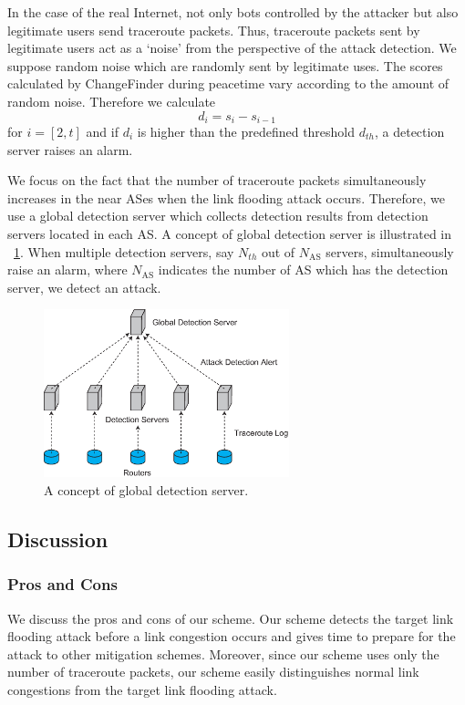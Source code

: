 \documentclass[conference]{IEEEtran}
\begin{document}
    In the case of the real Internet, not only bots controlled by the attacker but also legitimate users send traceroute packets.
    Thus, traceroute packets sent by legitimate users act as a `noise' from the perspective of the attack detection.
    We suppose random noise which are randomly sent by legitimate uses.
    The scores calculated by ChangeFinder during peacetime vary according to the amount of random noise.
    Therefore we calculate
    \begin{equation}
      d_i = s_i - s_{i-1}
      \label{Difference}
    \end{equation}
    for $i = [2, t]$ and if $d_i$ is higher than the predefined threshold $d_{th}$, a detection server raises an alarm.

    We focus on the fact that the number of traceroute packets simultaneously increases in the near ASes when the link flooding attack occurs.
    Therefore, we use a global detection server \cite{globaldetector} which collects detection results from detection servers located in each AS.
    A concept of global detection server is illustrated in \figurename~\ref{A concept of global detection server}.
    When multiple detection servers, say $N_{th}$ out of $N_{\text{AS}}$ servers, simultaneously raise an alarm, where $N_{\text{AS}}$ indicates the number of AS which has the detection server, we detect an attack.
    \begin{figure}[!t]
      \centering
      \includegraphics[clip, width=2.8in]{./image/GlobalDetector.eps}
      \caption{A concept of global detection server.}
      \label{A concept of global detection server}
    \end{figure}

  \subsection{Discussion}
  \subsubsection{Pros and Cons}
    We discuss the pros and cons of our scheme.
    Our scheme detects the target link flooding attack before a link congestion occurs and gives time to prepare for the attack to other mitigation schemes.
    Moreover, since our scheme uses only the number of traceroute packets, our scheme easily distinguishes normal link congestions from the target link flooding attack.
        
\end{document}
